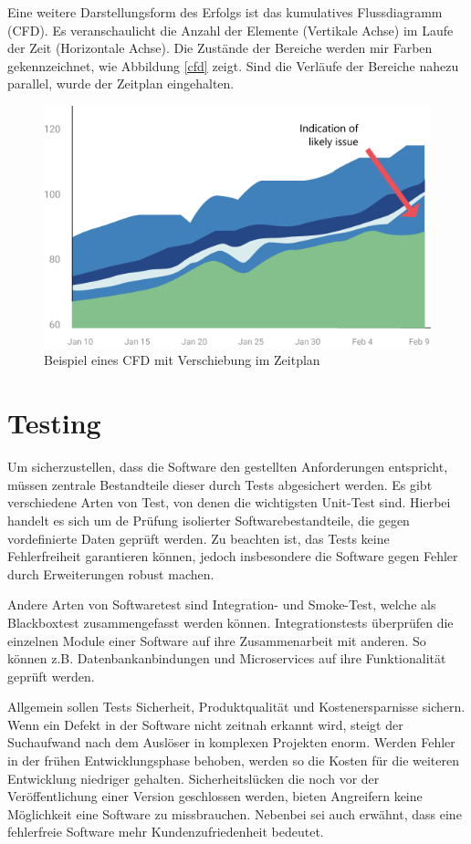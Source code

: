 Eine weitere Darstellungsform des Erfolgs ist das kumulatives Flussdiagramm (CFD). Es veranschaulicht die Anzahl der Elemente (Vertikale Achse) im Laufe der Zeit (Horizontale Achse). Die Zustände der Bereiche werden mir Farben gekennzeichnet, wie Abbildung \vref{cfd} zeigt. Sind die Verläufe der Bereiche nahezu parallel, wurde der Zeitplan eingehalten.

\begin{figure}[ht]
	\centering
	\includegraphics[width=.9\linewidth]{kanban-cumulative-flow-2.png}
	\caption{Beispiel eines CFD mit Verschiebung im Zeitplan}
	\label{cfd}
\end{figure}

\section{Testing}
Um sicherzustellen, dass die Software den gestellten Anforderungen entspricht, müssen zentrale Bestandteile dieser durch Tests abgesichert werden.
Es gibt verschiedene Arten von Test, von denen die wichtigsten Unit-Test sind.
Hierbei handelt es sich um de Prüfung isolierter Softwarebestandteile, die gegen vordefinierte Daten geprüft werden.
Zu beachten ist, das Tests keine Fehlerfreiheit garantieren können, jedoch insbesondere die Software gegen Fehler durch Erweiterungen robust machen.\cite{ms-testing}

Andere Arten von Softwaretest sind Integration- und Smoke-Test, welche als Blackboxtest zusammengefasst werden können.
Integrationstests überprüfen die einzelnen Module einer Software auf ihre Zusammenarbeit mit anderen.
So können z.B. Datenbankanbindungen und Microservices auf ihre Funktionalität geprüft werden.\cite{atlassian-testing}

Allgemein sollen Tests Sicherheit, Produktqualität und Kostenersparnisse sichern.
Wenn ein Defekt in der Software nicht zeitnah erkannt wird, steigt der Suchaufwand nach dem Auslöser in komplexen Projekten enorm.
Werden Fehler in der frühen Entwicklungsphase behoben, werden so die Kosten für die weiteren Entwicklung niedriger gehalten.
Sicherheitslücken die noch vor der Veröffentlichung einer Version geschlossen werden, bieten Angreifern keine Möglichkeit eine Software zu missbrauchen.
Nebenbei sei auch erwähnt, dass eine fehlerfreie Software mehr Kundenzufriedenheit bedeutet.\cite{stm-testing}